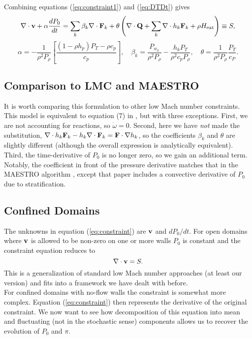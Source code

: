 \documentclass[final]{siamltex}
\def\Fb {{\bf F}}
\def\Qb {{\bf Q}}
\def\vb {{\bf v}}
\def\Hext {H_{\rm ext}}
\begin{document}
Combining equations (\ref{eq:constraint1}) and (\ref{eq:DTDt}) gives
\begin{equation}
\nabla\cdot\vb + \alpha\frac{dP_0}{dt} = \sum_k \beta_k \nabla\cdot\Fb_k + \theta\left(\nabla\cdot\Qb + \sum_k\nabla\cdot h_k\Fb_k + \rho\Hext\right) \equiv S,\label{eq:constraint}
\end{equation}
\begin{equation}
\alpha = -\frac{1}{\rho^2 P_\rho}\left[\frac{(1-\rho h_p)P_T - \rho c_p}{c_p}\right], \quad
\beta_k = \frac{P_{w_k}}{\rho^2 P_\rho} - \frac{h_k P_T}{\rho^2 c_p P_\rho}, \quad
\theta = \frac{1}{\rho^2 P_\rho}\frac{P_T}{c_P}.\label{eq:thermo deriv}
\end{equation}

\subsection{Comparison to LMC and MAESTRO}
It is worth comparing this formulation to other low Mach number constraints.
This model is equivalent to equation (7) in \cite{DayBell:2000},
but with three exceptions.  First,
we are not accounting for reactions, so $\dot\omega=0$.  Second, here we have 
{\it not} made the substitution, 
$\nabla\cdot h_k\Fb_k - h_k\nabla\cdot\Fb_k = \Fb\cdot\nabla h_k$, so the coefficients
$\beta_k$ and $\theta$ are slightly different (although the overall expression is
analytically equivalent).  Third, the time-derivative of $P_0$ is no longer zero,
so we gain an additional term.  Notably, the coefficient in front of the pressure 
derivative matches that in the MAESTRO algorithm \cite{MAESTROIII},
except that paper includes a convective derivative of $P_0$ due to stratification.

\subsection{Confined Domains}
The unknowns in equation (\ref{eq:constraint}) are $\vb$ and $dP_0/d t$.
For open domains where $\vb$ is allowed to be non-zero on one or more walls $P_0$
is constant and the constraint equation reduces to
\begin{equation}
\nabla\cdot\vb = S.
\end{equation}
This is a generalization of standard low Mach number approaches (at least our version) 
and fits into
a framework we have dealt with before.\\

For confined domains with no-flow walls the constraint is somewhat more complex.
Equation (\ref{eq:constraint}) then represents the derivative of the original
constraint.  We now want to see how
decomposition of this equation into mean and fluctuating (not in the stochastic sense)
components allows us to recover the evolution of $P_0$ and $\pi$.\\
\end{document}
